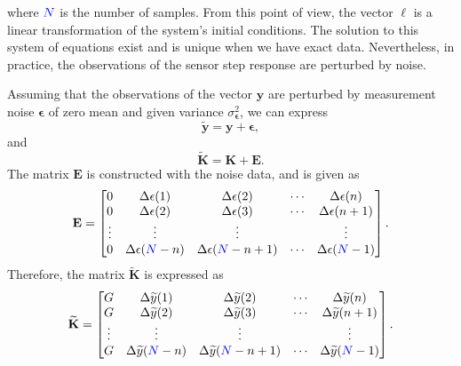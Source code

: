 where $\color{blue}N\color{black}$ is the number of samples.
\color{blue} From this point of view, the vector $\bm{\ell}$ is a linear transformation of the system's initial conditions\color{black}.  
The solution to this system of equations exist and is unique when we have exact data.
Nevertheless, in practice, the observations of the sensor step response are perturbed by noise.



Assuming that the observations of the vector $\mathbf{y}$ are perturbed by measurement noise $\bm{\epsilon}$ of zero mean and given variance $\sigma_{\bm{\epsilon}}^2$, we can express 
\begin{equation} \widetilde{\mathbf{y}} = \mathbf{y} + \bm{\epsilon} , \label{eqn:y0plusnoise} \end{equation} 
and
\begin{equation} \widetilde{\mathbf{K}} = \mathbf{K} + \mathbf{E} . \label{eqn:K0plusnoise} \end{equation}
The matrix $\mathbf{E}$ is constructed with the noise data, and is given as
\begin{equation} \mathbf{E} = \begin{bmatrix} 0 & \Delta \epsilon(1) & \Delta \epsilon(2) & \cdots & \Delta \epsilon(n) \\ 0 & \Delta \epsilon(2) & \Delta \epsilon(3) & \cdots & \Delta \epsilon(n+1) \\ \vdots & \vdots & \vdots & & \vdots \\ 0 & \Delta \epsilon(\color{blue}N\color{black}-n) & \Delta \epsilon(\color{blue}N\color{black}-n+1) & \cdots & \Delta \epsilon(\color{blue}N\color{black}-1) \end{bmatrix} . \label{eqn:matrixE} \end{equation}
Therefore, the matrix $\widetilde{\mathbf{K}}$ is expressed as
\begin{equation} \widetilde{\mathbf{K}} = \begin{bmatrix} G & \Delta \widetilde{y}(1) & \Delta \widetilde{y}(2) & \cdots & \Delta \widetilde{y}(n) \\ G & \Delta \widetilde{y}(2) & \Delta \widetilde{y}(3) & \cdots & \Delta \widetilde{y}(n+1) \\ \vdots & \vdots & \vdots & & \vdots \\ G & \Delta \widetilde{y}(\color{blue}N\color{black}-n) & \Delta \widetilde{y}(\color{blue}N\color{black}-n+1) & \cdots & \Delta \widetilde{y}(\color{blue}N\color{black}-1) \end{bmatrix} . \label{eqn:matrixK} \end{equation}

